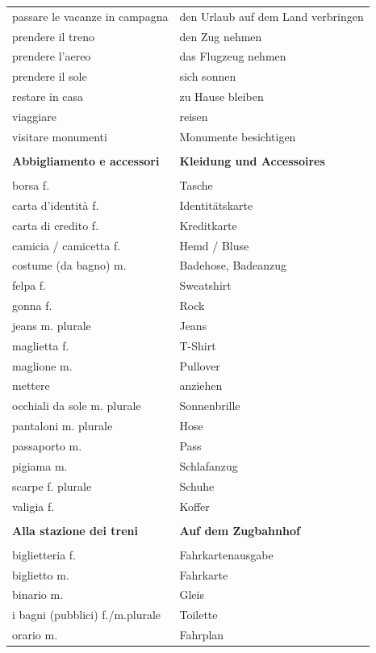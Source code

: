 \documentclass[10pt]{scrartcl}
\begin{document}
\begin{multicols*}{2}
\begin{supertabular}{p{4cm}p{4cm}}
passare le vacanze in campagna & den Urlaub auf dem Land verbringen\\
prendere il treno & den Zug nehmen\\
prendere l'aereo & das Flugzeug nehmen\\
prendere il sole & sich sonnen\\
restare in casa & zu Hause bleiben\\
viaggiare & reisen\\
visitare monumenti & Monumente besichtigen\\
\\
\textbf{Abbigliamento e accessori} & \textbf{Kleidung und Accessoires}\\
\\
borsa \hfill f. & Tasche\\
carta d'identità \hfill f. & Identitätskarte\\
carta di credito \hfill f. & Kreditkarte\\
camicia / camicetta \hfill f. & Hemd / Bluse\\
costume (da bagno) \hfill m. & Badehose, Badeanzug\\
felpa \hfill f. & Sweatshirt\\
gonna \hfill f. & Rock\\
jeans \hfill m. plurale & Jeans\\
maglietta \hfill f. & T-Shirt\\
maglione \hfill m. & Pullover\\
mettere & anziehen \\
occhiali da sole \hfill m. plurale & Sonnenbrille\\
pantaloni \hfill m. plurale & Hose\\
passaporto \hfill m. & Pass\\
pigiama \hfill m. & Schlafanzug\\
scarpe \hfill f. plurale & Schuhe\\
valigia \hfill f. & Koffer\\
\\
\textbf{Alla stazione dei treni} & \textbf{Auf dem Zugbahnhof}\\
\\
biglietteria \hfill f. & Fahrkartenausgabe\\
biglietto \hfill m. & Fahrkarte\\
binario \hfill m. & Gleis\\
i bagni (pubblici) \hfill f./m.plurale & Toilette\\
orario \hfill m. & Fahrplan\\

\end{supertabular}
\end{multicols*}
\end{document}
